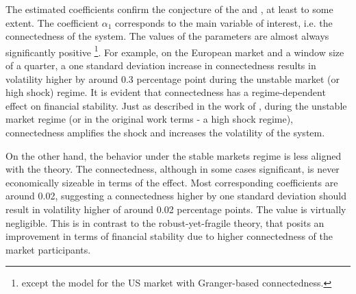 \documentclass[12pt]{article}
\begin{document}
The estimated coefficients confirm the conjecture of the \citet{acemoglu13} and \citet{haldane13}, at least to some extent. The coefficient $\alpha_1$ corresponds to the main variable of interest, i.e. the connectedness of the system. The values of the parameters are almost always significantly positive \footnote{except the model for the US market with Granger-based connectedness.}. For example, on the European market and a window size of a quarter, a one standard deviation increase in connectedness results in volatility higher by around 0.3 percentage point during the unstable market (or high shock) regime. It is evident that connectedness has a regime-dependent effect on financial stability. Just as described in the work of \citet{acemoglu13}, during the unstable market regime (or in the original work terms - a high shock regime), connectedness amplifies the shock and increases the volatility of the system. 

On the other hand, the behavior under the stable markets regime is less aligned with the theory. The connectedness, although in some cases significant, is never economically sizeable in terms of the effect. Most corresponding coefficients are around 0.02, suggesting a connectedness higher by one standard deviation should result in volatility higher of around 0.02 percentage points. The value is virtually negligible. This is in contrast to the robust-yet-fragile theory, that posits an improvement in terms of financial stability due to higher connectedness of the market participants.
\end{document}
